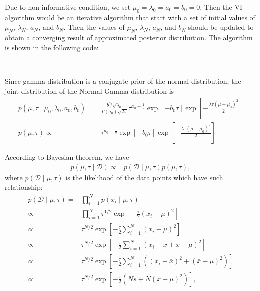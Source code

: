 \documentclass[11pt]{extarticle}
\newcommand{\D}{\mathcal{D}}
\newcommand{\0}{\mathbf{0}}
\renewcommand{\(}{\left(}
\renewcommand{\)}{\right)}
\theoremstyle{definition}
\begin{document}
\par Due to non-informative condition, we set $\mu_{0} = \lambda_{0} = a_{0} = b_{0} = 0$. Then the VI algorithm would be an iterative algorithm that start with a set of initial values of $\mu_N$, $\lambda_{N}$, $a_{N}$, and $b_{N}$. Then the values of $\mu_N$, $\lambda_{N}$, $a_{N}$, and $b_{N}$ should be updated to obtain a converging result of approximated posterior distribution. The algorithm is shown in the following code:


\noindent{} \\
\par Since gamma distribution is a conjugate prior of the normal distribution, the joint distribution of the Normal-Gamma distribution is
\begin{align*}
    p(\mu, \tau \mid \mu_{0}, \lambda_{0}, a_{0}, b_{0}) =& \frac{b_{0}^{a_{0}} \sqrt{\lambda_{0}}}{\Gamma(a_{0})\sqrt{2\pi}} \tau^{a_{0}-\frac{1}{2}} \exp\left[-b_{0}\tau\right] \exp\left[-\frac{ \lambda \tau(\mu - \mu_{0})^2}{2}\right] \\
    p(\mu, \tau) \propto& \tau^{a_{0}-\frac{1}{2}} \exp\left[-b_{0}\tau\right] \exp\left[-\frac{ \lambda \tau(\mu - \mu_{0})^2}{2}\right]
\end{align*}
\par According to Bayesian theorem, we have
\begin{align*}
	p(\mu, \tau \mid \D) \propto& p(\D \mid \mu, \tau) p(\mu, \tau),
\end{align*}
where $p(\D \mid \mu, \tau)$ is the likelihood of the data points which have such relationship:
\begin{align*}
	p(\D \mid \mu, \tau) =& \prod_{i=1}^{N} p(x_{i} \mid \mu, \tau) \\
	\propto& \prod_{i=1}^{N} \tau^{1/2} \exp\left[-\frac{\tau}{2}(x_{i} - \mu)^{2}\right] \\
	\propto& \tau^{N/2} \exp\left[-\frac{\tau}{2}\sum_{i=1}^{N}(x_{i} - \mu)^{2}\right] \\
	\propto& \tau^{N/2} \exp\left[-\frac{\tau}{2}\sum_{i=1}^{N}(x_{i} - \bar{x} + \bar{x} - \mu)^{2}\right] \\
	\propto& \tau^{N/2} \exp\left[-\frac{\tau}{2}\sum_{i=1}^{N}\((x_{i}-\bar{x})^{2}+(\bar{x}-\mu)^{2}\)\right] \\
	\propto& \tau^{N/2} \exp\left[-\frac{\tau}{2}\(Ns+N(\bar{x}-\mu)^{2}\)\right],
\end{align*}
\end{document}
